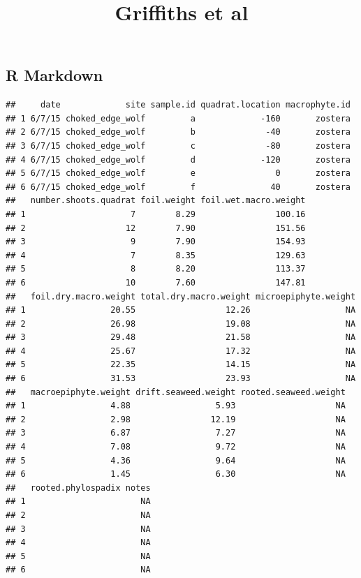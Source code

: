 \documentclass[]{article}
\title{Griffiths et al}
\author{}
\date{}
\begin{document}
\maketitle

\subsection{R Markdown}\label{r-markdown}

\begin{verbatim}
##     date             site sample.id quadrat.location macrophyte.id
## 1 6/7/15 choked_edge_wolf         a             -160       zostera
## 2 6/7/15 choked_edge_wolf         b              -40       zostera
## 3 6/7/15 choked_edge_wolf         c              -80       zostera
## 4 6/7/15 choked_edge_wolf         d             -120       zostera
## 5 6/7/15 choked_edge_wolf         e                0       zostera
## 6 6/7/15 choked_edge_wolf         f               40       zostera
##   number.shoots.quadrat foil.weight foil.wet.macro.weight
## 1                     7        8.29                100.16
## 2                    12        7.90                151.56
## 3                     9        7.90                154.93
## 4                     7        8.35                129.63
## 5                     8        8.20                113.37
## 6                    10        7.60                147.81
##   foil.dry.macro.weight total.dry.macro.weight microepiphyte.weight
## 1                 20.55                  12.26                   NA
## 2                 26.98                  19.08                   NA
## 3                 29.48                  21.58                   NA
## 4                 25.67                  17.32                   NA
## 5                 22.35                  14.15                   NA
## 6                 31.53                  23.93                   NA
##   macroepiphyte.weight drift.seaweed.weight rooted.seaweed.weight
## 1                 4.88                 5.93                    NA
## 2                 2.98                12.19                    NA
## 3                 6.87                 7.27                    NA
## 4                 7.08                 9.72                    NA
## 5                 4.36                 9.64                    NA
## 6                 1.45                 6.30                    NA
##   rooted.phylospadix notes
## 1                       NA
## 2                       NA
## 3                       NA
## 4                       NA
## 5                       NA
## 6                       NA
\end{verbatim}
\end{document}
